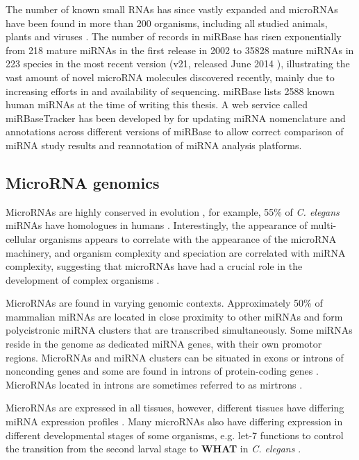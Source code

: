The number of known small RNAs has since vastly expanded
and microRNAs have been found in more than 200 organisms, including
all studied animals, plants \citep{JonesRhoades2006} and viruses \citep{Grundhoff2011}. 
The number of records in miRBase has risen exponentially
from %
218 mature miRNAs in the first release in 2002 to %
35828 mature miRNAs in 223 species in the most recent version (v21, released June
2014 \citep{VanPeer2014,MiRBaseWeb}), illustrating the vast amount of novel
microRNA molecules discovered recently, mainly due to increasing efforts in
and availability of sequencing. miRBase lists 2588 known human miRNAs at the
time of writing this thesis. A web service called miRBaseTracker has been
developed by \citet{VanPeer2014} for updating miRNA nomenclature and
annotations across different versions of miRBase to allow correct comparison
of miRNA study results and reannotation of miRNA analysis platforms.




\subsection{MicroRNA genomics}\label{microrna-genomics}

MicroRNAs are highly conserved in evolution \citep{Bartel2004}, for example,
55\% of \emph{C. elegans} miRNAs have homologues in humans
\citep{IbanezVentoso2008}. Interestingly, the
appearance of multi-cellular organisms appears to correlate with the
appearance of the microRNA machinery, and organism complexity and speciation
are correlated with miRNA complexity, suggesting that microRNAs have had a
crucial role in the development of complex organisms \citep{Lee2007}.

MicroRNAs are found in varying genomic contexts. Approximately 50\% of
mammalian miRNAs are located in close proximity to other miRNAs and form
polycistronic miRNA clusters that are transcribed simultaneously. Some miRNAs
reside in the genome as dedicated miRNA genes, with their own promotor regions.
\citep{Kim2009} MicroRNAs and miRNA clusters can be situated in exons or
introns of nonconding genes and some are found in introns of protein-coding genes
\citep{Du2005}. MicroRNAs located in introns are sometimes referred to as
mirtrons \citep{Ruby2007}.

MicroRNAs are expressed in all tissues, however, different tissues
have differing miRNA expression profiles \citep{Krol2010}. Many microRNAs also
have differing expression in different developmental stages
of some organisms, e.g. let-7 functions to control the transition
from the second larval stage to \textbf{WHAT} in \emph{C. elegans} \citep{Bartel2004}.

